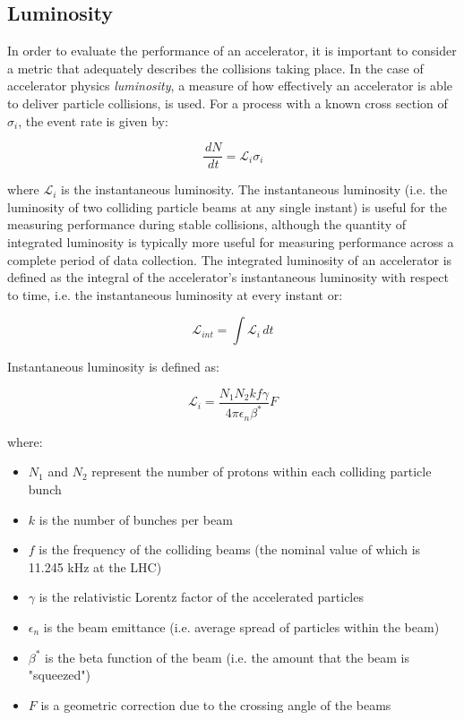 \documentclass[12pt,a4paper,epsf,portrait,times,epsfig]{report}
\begin{document}

		\subsection{Luminosity} \label{Section:Luminosity}

		In order to evaluate the performance of an accelerator, it is important to consider a metric that adequately describes the collisions taking place. In the case of accelerator physics \textit{luminosity}, a measure of how effectively an accelerator is able to deliver particle collisions, is used. For a process with a known cross section of $\sigma_{i}$, the event rate is given by:
		
		\begin{equation}
			\frac{\,dN}{\,dt} = \mathcal{L}_{i}\sigma_{i}
		\end{equation}

		where $\mathcal{L}_{i}$ is the instantaneous luminosity. The instantaneous luminosity (i.e. the luminosity of two colliding particle beams at any single instant) is useful for the measuring performance during stable collisions, although the quantity of integrated luminosity is typically more useful for measuring performance across a complete period of data collection. The integrated luminosity of an accelerator is defined as the integral of the accelerator's instantaneous luminosity with respect to time, i.e. the instantaneous luminosity at every instant or:
		
		\begin{equation}
			\mathcal{L}_{int} = \int \mathcal{L}_{i} \,dt 			
		\end{equation}

		Instantaneous luminosity is defined as: 

		\begin{equation}
			\mathcal{L}_{i} = \frac{N_{1}N_{2}kf\gamma}{4\pi\epsilon_{n}\beta^{*}}F
		\end{equation}
		
		where:

		\begin{itemize}
			\item $N_{1}$ and $N_{2}$ represent the number of protons within each colliding particle bunch
			\item $k$ is the number of bunches per beam
			\item $f$ is the frequency of the colliding beams (the nominal value of which is 11.245 kHz at the LHC)
			\item $\gamma$ is the relativistic Lorentz factor of the accelerated particles
			\item $\epsilon_{n}$ is the beam emittance (i.e. average spread of particles within the beam)
			\item $\beta^{*}$ is the beta function of the beam (i.e. the amount that the beam is "squeezed")
			\item $F$ is a geometric correction due to the crossing angle of the beams
		\end{itemize}
\end{document}
